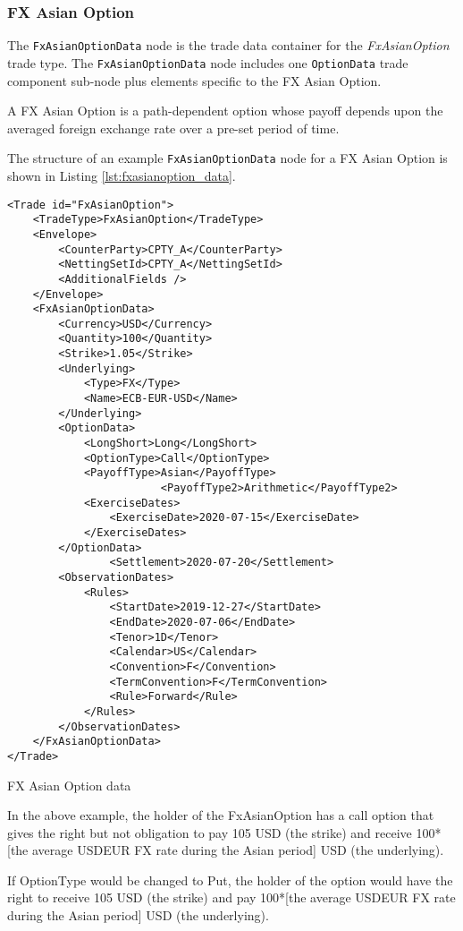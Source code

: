 \subsubsection{FX Asian Option}

The \lstinline!FxAsianOptionData!  node is the trade data container for the \emph{FxAsianOption} trade type. 
The \lstinline!FxAsianOptionData!  node includes one  \lstinline!OptionData! trade component sub-node plus elements
specific to the FX Asian Option. 

A FX Asian Option is a path-dependent option whose payoff depends upon the averaged foreign exchange rate 
over a pre-set period of time.

The structure of an example \lstinline!FxAsianOptionData! node for a FX Asian Option is shown in Listing
\ref{lst:fxasianoption_data}.

\begin{listing}[H]
	\begin{verbatim}
<Trade id="FxAsianOption">
	<TradeType>FxAsianOption</TradeType>
	<Envelope>
		<CounterParty>CPTY_A</CounterParty>
		<NettingSetId>CPTY_A</NettingSetId>
		<AdditionalFields />
	</Envelope>
	<FxAsianOptionData>
		<Currency>USD</Currency>
		<Quantity>100</Quantity>
		<Strike>1.05</Strike>
		<Underlying>
			<Type>FX</Type>
			<Name>ECB-EUR-USD</Name>
		</Underlying>
		<OptionData>
			<LongShort>Long</LongShort>
			<OptionType>Call</OptionType>
			<PayoffType>Asian</PayoffType>
                        <PayoffType2>Arithmetic</PayoffType2>
			<ExerciseDates>
				<ExerciseDate>2020-07-15</ExerciseDate>
			</ExerciseDates>
		</OptionData>
                <Settlement>2020-07-20</Settlement>
		<ObservationDates>
			<Rules>
				<StartDate>2019-12-27</StartDate>
				<EndDate>2020-07-06</EndDate>
				<Tenor>1D</Tenor>
				<Calendar>US</Calendar>
				<Convention>F</Convention>
				<TermConvention>F</TermConvention>
				<Rule>Forward</Rule>
			</Rules>
		</ObservationDates>
	</FxAsianOptionData>
</Trade>
\end{verbatim}
\caption{FX Asian Option data}
\label{lst:fxasianoption_data}
\end{listing}

In the above example, the holder of the FxAsianOption has a call option that gives the right but not obligation to pay 105 USD (the strike) and receive 100*[the average USDEUR FX rate during the Asian period] USD (the underlying).  

If OptionType would be changed to Put, the holder of the option would have the right to  receive 105 USD (the strike) and pay 100*[the average USDEUR FX rate during the Asian period] USD (the underlying). 


